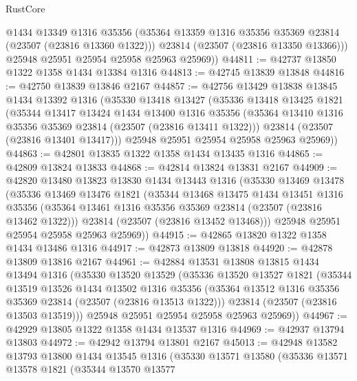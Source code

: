 \begin{lexlean}{RustCore}
\begin{coremodule}
          @1434
          @13349
          @1316
          @35356
          (@35364 @13359 @1316 @35356 @35369 @23814 (@23507 (@23816 @13360 @1322)))
          @23814
          (@23507 (@23816 @13350 @13366)))
        @25948
        @25951
        @25954
        @25958
        @25963
        @25969))
@44811 := @42737 @13850 @1322 @1358 @1434 @13384 @1316
@44813 := @42745 @13839 @13848
@44816 := @42750 @13839 @13846 @2167
@44857 := @42756
    @13429
    @13838
    @13845
    @1434
    @13392
    @1316
    (@35330
      @13418
      @13427
      (@35336
        @13418
        @13425
        @1821
        (@35344
          @13417
          @13424
          @1434
          @13400
          @1316
          @35356
          (@35364 @13410 @1316 @35356 @35369 @23814 (@23507 (@23816 @13411 @1322)))
          @23814
          (@23507 (@23816 @13401 @13417)))
        @25948
        @25951
        @25954
        @25958
        @25963
        @25969))
@44863 := @42801 @13835 @1322 @1358 @1434 @13435 @1316
@44865 := @42809 @13824 @13833
@44868 := @42814 @13824 @13831 @2167
@44909 := @42820
    @13480
    @13823
    @13830
    @1434
    @13443
    @1316
    (@35330
      @13469
      @13478
      (@35336
        @13469
        @13476
        @1821
        (@35344
          @13468
          @13475
          @1434
          @13451
          @1316
          @35356
          (@35364 @13461 @1316 @35356 @35369 @23814 (@23507 (@23816 @13462 @1322)))
          @23814
          (@23507 (@23816 @13452 @13468)))
        @25948
        @25951
        @25954
        @25958
        @25963
        @25969))
@44915 := @42865 @13820 @1322 @1358 @1434 @13486 @1316
@44917 := @42873 @13809 @13818
@44920 := @42878 @13809 @13816 @2167
@44961 := @42884
    @13531
    @13808
    @13815
    @1434
    @13494
    @1316
    (@35330
      @13520
      @13529
      (@35336
        @13520
        @13527
        @1821
        (@35344
          @13519
          @13526
          @1434
          @13502
          @1316
          @35356
          (@35364 @13512 @1316 @35356 @35369 @23814 (@23507 (@23816 @13513 @1322)))
          @23814
          (@23507 (@23816 @13503 @13519)))
        @25948
        @25951
        @25954
        @25958
        @25963
        @25969))
@44967 := @42929 @13805 @1322 @1358 @1434 @13537 @1316
@44969 := @42937 @13794 @13803
@44972 := @42942 @13794 @13801 @2167
@45013 := @42948
    @13582
    @13793
    @13800
    @1434
    @13545
    @1316
    (@35330
      @13571
      @13580
      (@35336
        @13571
        @13578
        @1821
        (@35344
          @13570
          @13577

\end{coremodule}
\end{lexlean}
